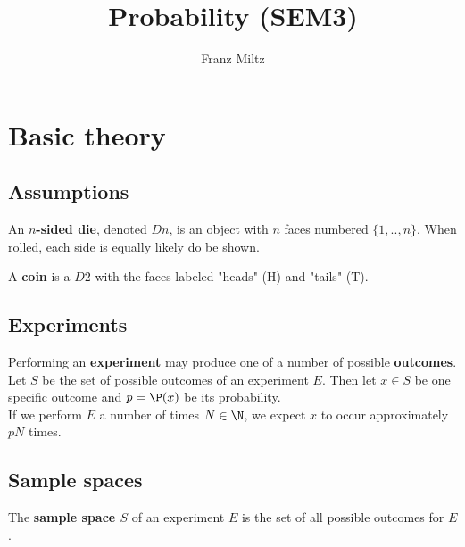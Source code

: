 \documentclass{article}
\begin{document}
\title{Probability (SEM3)}
\author{Franz Miltz}
\maketitle
\tableofcontents
\pagebreak

\section{Basic theory}
\subsection{Assumptions}
\begin{definition}
	An \textbf{$n$-sided die}, denoted $Dn$, is an object with $n$ faces numbered $\{1,..,n\}$.
	When rolled, each side is equally likely do be shown.
\end{definition}
\begin{definition}
	A \textbf{coin} is a $D2$ with the faces labeled "heads" (H) and "tails" (T).
\end{definition}
\subsection{Experiments}
\begin{definition}
	Performing an \textbf{experiment} may produce one of a number of possible \textbf{outcomes}.
	Let $S$ be the set of possible outcomes of an experiment $E$. Then let $x\in S$ be one specific outcome and
	$p=\P(x)$ be its probability.\\
	If we perform $E$ a number of times $N\in\N$, we expect $x$ to occur approximately $pN$ times.
\end{definition}
\subsection{Sample spaces}
\begin{definition}
	The \textbf{sample space $S$} of an experiment $E$ is the set of all possible outcomes for $E$.
\end{definition}
\end{document}
